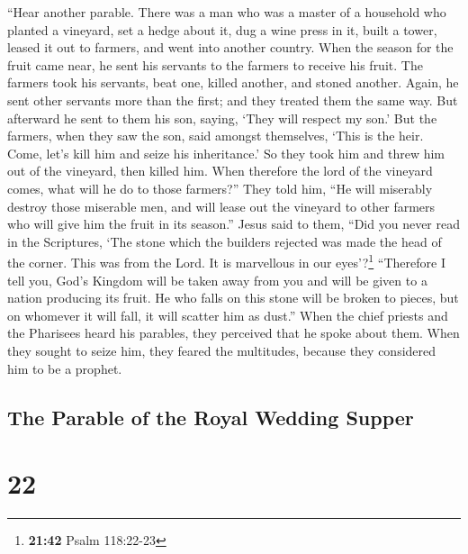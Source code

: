  ``Hear another parable. There was a man who was a master
of a household who planted a vineyard, set a hedge about it, dug a wine
press in it, built a tower, leased it out to farmers, and went into
another country.  When the season for the fruit came
near, he sent his servants to the farmers to receive his fruit.
 The farmers took his servants, beat one, killed another,
and stoned another.  Again, he sent other servants more
than the first; and they treated them the same way.  But
afterward he sent to them his son, saying, `They will respect my son.'
 But the farmers, when they saw the son, said amongst
themselves, `This is the heir. Come, let's kill him and seize his
inheritance.'  So they took him and threw him out of the
vineyard, then killed him.  When therefore the lord of
the vineyard comes, what will he do to those farmers?'' 
They told him, ``He will miserably destroy those miserable men, and will
lease out the vineyard to other farmers who will give him the fruit in
its season.''  Jesus said to them, ``Did you never read
in the Scriptures, `The stone which the builders rejected was made the
head of the corner. This was from the Lord. It is marvellous in our
eyes'?\footnote{\textbf{21:42} Psalm 118:22-23} 
``Therefore I tell you, God's Kingdom will be taken away from you and
will be given to a nation producing its fruit.  He who
falls on this stone will be broken to pieces, but on whomever it will
fall, it will scatter him as dust.''  When the chief
priests and the Pharisees heard his parables, they perceived that he
spoke about them.  When they sought to seize him, they
feared the multitudes, because they considered him to be a prophet.

\hypertarget{the-parable-of-the-royal-wedding-supper}{%
\subsection{The Parable of the Royal Wedding
Supper}\label{the-parable-of-the-royal-wedding-supper}}

\hypertarget{section-21}{%
\section{22}\label{section-21}}


